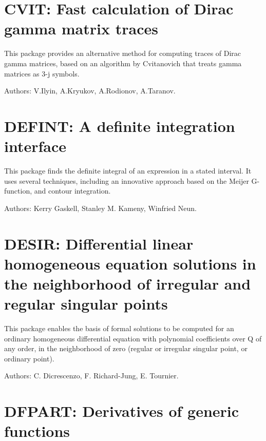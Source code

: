 \newpage

\section{CVIT: Fast calculation of Dirac gamma matrix traces}
\label{CVIT}

This package provides an alternative method for computing traces of Dirac
gamma matrices, based on an algorithm by Cvitanovich that treats gamma
matrices as 3-j symbols.

Authors: V.Ilyin, A.Kryukov, A.Rodionov, A.Taranov.


\newpage

\section{DEFINT: A definite integration interface}
\label{DEFINT}

This package finds the definite integral of an expression in a stated
interval.  It uses several techniques, including an innovative approach
based on the Meijer G-function, and contour integration.

Authors: Kerry Gaskell, Stanley M. Kameny, Winfried Neun.


\newpage

\section{DESIR: Differential linear homogeneous equation solutions in the
              neighborhood of irregular and regular singular points}

This package enables the basis of formal solutions to be computed for an
ordinary homogeneous differential equation with polynomial coefficients
over Q of any order, in the neighborhood of zero (regular or irregular
singular point, or ordinary point).

Authors: C. Dicrescenzo, F. Richard-Jung, E. Tournier.


\newpage

\section{DFPART: Derivatives of generic functions}

